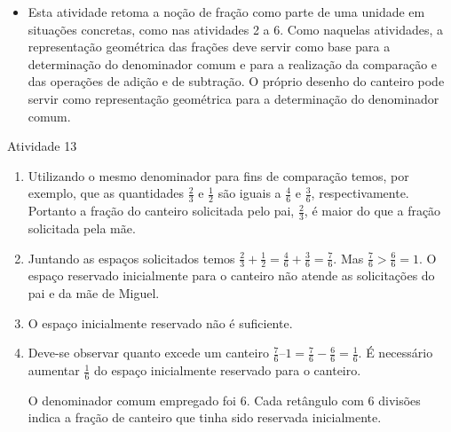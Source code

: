 \begin{multicols}{2}
  \begin{itemize} %
    \item       Esta atividade retoma a noção de fração como parte de uma unidade em situações concretas, como nas atividades 2 a 6. Como naquelas atividades, a representação geométrica das frações deve servir como base para a determinação do denominador comum e para a realização da comparação e das operações de adição e de subtração. O próprio desenho do canteiro pode servir como representação geométrica para a determinação do denominador comum.
\end{itemize} %

\begin{resposta*}{Atividade 13}
\begin{enumerate} [\quad a)] %
  \item     Utilizando o mesmo denominador para fins de comparação temos, por exemplo, que as quantidades     $\frac{2}{3}$     e     $\frac{1}{2}$     são iguais a     $\frac{4}{6}$     e     $\frac{3}{6}$, respectivamente. Portanto a fração do canteiro solicitada pelo pai,     $\frac{2}{3}$, é maior do que a fração solicitada pela mãe.
  \item     Juntando as espaços solicitados temos     $\frac{2}{3} + \frac{1}{2} = \frac{4}{6} + \frac{3}{6} = \frac{7}{6}$. Mas     $\frac{7}{6}>\frac{6}{6}=1$. O espaço reservado inicialmente para o canteiro não atende as solicitações do pai e da mãe de Miguel.
  \item     O espaço inicialmente reservado não é suficiente.
  \item     Deve-se observar quanto excede um canteiro  $\frac{7}{6} – 1 = \frac{7}{6} - \frac{6}{6} = \frac{1}{6}$. É necessário aumentar $\frac{1}{6}$ do espaço inicialmente reservado para o canteiro.

O denominador comum empregado foi 6. Cada retângulo com 6 divisões indica a fração de canteiro que tinha sido reservada inicialmente.

\begin{center}
\end{center}



\end{enumerate}
\end{resposta*}
\end{multicols}
